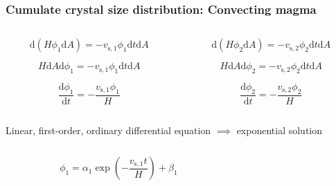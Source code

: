 \documentclass{beamer}
\begin{document}
\begin{frame}
  \frametitle{Cumulate crystal size distribution: Convecting magma}

  \vspace{-1cm}
  
  \begin{columns}[t]

    \begin{column}{0.5\paperwidth}

      $$ \mathrm{d}(H \phi_{1} \mathrm{d}A) = -v_{\text{s}, 1} \phi_{1} \mathrm{d}t \mathrm{d}A $$

      $$ H \mathrm{d}A \mathrm{d}\phi_{1} = -v_{\text{s}, 1} \phi_{1} \mathrm{d}t \mathrm{d}A $$

      $$ \frac{\mathrm{d} \phi_{1}}{\mathrm{d} t} = -\frac{v_{\text{s}, 1} \phi_{1}}{H}$$
    \end{column}

    \begin{column}{0.5\paperwidth}

      $$ \mathrm{d}(H \phi_{2} \mathrm{d}A) = -v_{\text{s}, 2} \phi_{2} \mathrm{d}t \mathrm{d}A $$

      $$ H \mathrm{d}A \mathrm{d}\phi_{2} = -v_{\text{s}, 2} \phi_{2} \mathrm{d}t \mathrm{d}A $$
      
      $$ \frac{\mathrm{d} \phi_{2}}{\mathrm{d} t} = -\frac{v_{\text{s}, 2} \phi_{2}}{H}$$
    \end{column}
    
  \end{columns}

  \vspace{0.5cm}
  
  Linear, first-order, ordinary differential equation $\implies$ exponential solution \\

  \vspace{-0.5cm}
  
  \begin{columns}[t]

    \begin{column}{0.5\paperwidth}

      $$ \phi_{1} = \alpha_{1} \exp\left(-\frac{v_{\text{s}, 1} t}{H}\right) + \beta_{1} $$

    \end{column}

    \begin{column}{0.5\paperwidth}


\end{column}
\end{columns}
\end{frame}
\end{document}
